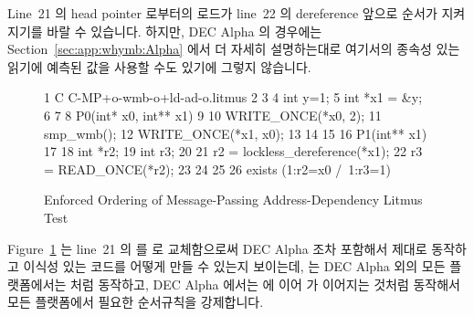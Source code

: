 Line~21 의 head pointer 로부터의 로드가 line~22 의 dereference 앞으로 순서가
지켜지기를 바랄 수 있습니다.
하지만, DEC Alpha 의 경우에는
Section~\ref{sec:app:whymb:Alpha}
에서 더 자세히 설명하는대로 여기서의 종속성 있는 읽기에 예측된 값을 사용할 수도
있기에 그렇지 않습니다.

\begin{figure}[tbp]
{ \scriptsize
\begin{verbbox}
 1 C C-MP+o-wmb-o+ld-ad-o.litmus
 2
 3 {
 4 int y=1;
 5 int *x1 = &y;
 6 }
 7
 8 P0(int* x0, int** x1) {
 9
10   WRITE_ONCE(*x0, 2);
11   smp_wmb();
12   WRITE_ONCE(*x1, x0);
13
14 }
15
16 P1(int** x1) {
17
18   int *r2;
19   int r3;
20
21   r2 = lockless_dereference(*x1);
22   r3 = READ_ONCE(*r2);
23
24 }
25
26 exists (1:r2=x0 /\ 1:r3=1)
\end{verbbox}
}
\centering
\theverbbox
\caption{Enforced Ordering of Message-Passing Address-Dependency Litmus Test}
\label{fig:advsync:Enforced Ordering of Message-Passing Address-Dependency Litmus Test}
\end{figure}

Figure~\ref{fig:advsync:Enforced Ordering of Message-Passing Address-Dependency Litmus Test}
는 line~21 의  를  로 교체함으로써
DEC Alpha 조차 포함해서 제대로 동작하고 이식성 있는 코드를 어떻게 만들 수
있는지 보이는데,  는 DEC Alpha 외의 모든
플랫폼에서는  처럼 동작하고, DEC Alpha 에서는 
에 이어  가 이어지는 것처럼 동작해서 모든 플랫폼에서 필요한
순서규칙을 강제합니다.
\iffalse


